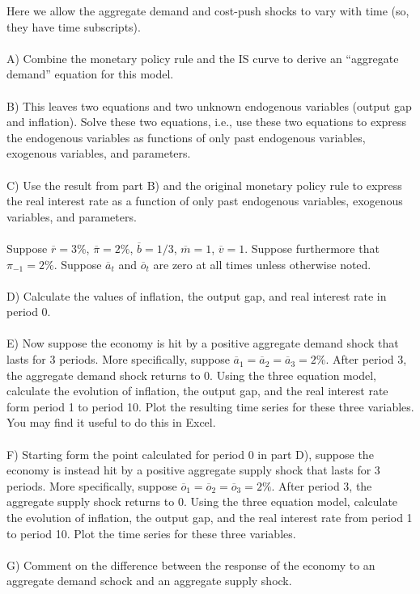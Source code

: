 \begin{homeworkProblem}[2]
    Here we allow the aggregate demand and cost-push shocks to vary with time (so,
    they have time subscripts).
    \\ \\
    A) Combine the monetary policy rule and the IS curve to derive an ``aggregate
    demand'' equation for this model.
    \\ \\
    B) This leaves two equations and two unknown endogenous variables (output gap 
    and inflation). Solve these two equations, i.e., use these two equations to 
    express the endogenous variables as functions of only past endogenous variables, 
    exogenous variables, and parameters. 
    \\ \\
    C) Use the result from part B) and the original monetary policy rule to express
    the real interest rate as a function of only past endogenous variables, exogenous
    variables, and parameters. 
    \\ \\
    Suppose $\overline{r} = 3\%$, $\overline{\pi} = 2\%$, $\overline{b}=1/3$, 
    $\overline{m} = 1$, $\overline{v}=1$. Suppose furthermore that $\pi_{-1} = 2\%$.
    Suppose $\overline{a}_t$ and $\overline{o}_t$ are zero at all times unless otherwise
    noted. 
    \\ \\
    D) Calculate the values of inflation, the output gap, and real interest rate in
    period 0.
    \\ \\
    E) Now suppose the economy is hit by a positive aggregate demand shock that lasts
    for 3 periods. More specifically, suppose $\overline{a}_1 = \overline{a}_2 = 
    \overline{a}_3 = 2\%$. After period 3, the aggregate demand shock returns to 0. 
    Using the three equation model, calculate the evolution of inflation, the output gap,
    and the real interest rate form period 1 to period 10. Plot the resulting time series
    for these three variables. You may find it useful to do this in Excel.
    \\ \\
    F) Starting form the point calculated for period 0 in part D), suppose the economy is 
    instead hit by a positive aggregate supply shock that lasts for 3 periods. More 
    specifically, suppose $\overline{o}_1 = \overline{o}_2 = \overline{o}_3 = 2\%$. After
    period 3, the aggregate supply shock returns to 0. Using the three equation model, 
    calculate the evolution of inflation, the output gap, and the real interest rate from
    period 1 to period 10. Plot the time series for these three variables. 
    \\ \\
    G) Comment on the difference between the response of the economy to an aggregate demand 
    schock and an aggregate supply shock.
    

\end{homeworkProblem}
